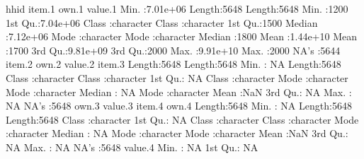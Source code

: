 \begin{Schunk}
\begin{Soutput}
      hhid             item.1             own.1              value.1    
 Min.   :7.01e+06   Length:5648        Length:5648        Min.   :1200  
 1st Qu.:7.04e+06   Class :character   Class :character   1st Qu.:1500  
 Median :7.12e+06   Mode  :character   Mode  :character   Median :1800  
 Mean   :1.44e+10                                         Mean   :1700  
 3rd Qu.:9.81e+09                                         3rd Qu.:2000  
 Max.   :9.91e+10                                         Max.   :2000  
                                                          NA's   :5644  
    item.2             own.2              value.2        item.3         
 Length:5648        Length:5648        Min.   : NA    Length:5648       
 Class :character   Class :character   1st Qu.: NA    Class :character  
 Mode  :character   Mode  :character   Median : NA    Mode  :character  
                                       Mean   :NaN                      
                                       3rd Qu.: NA                      
                                       Max.   : NA                      
                                       NA's   :5648                     
    own.3              value.3        item.4             own.4          
 Length:5648        Min.   : NA    Length:5648        Length:5648       
 Class :character   1st Qu.: NA    Class :character   Class :character  
 Mode  :character   Median : NA    Mode  :character   Mode  :character  
                    Mean   :NaN                                         
                    3rd Qu.: NA                                         
                    Max.   : NA                                         
                    NA's   :5648                                        
    value.4    
 Min.   : NA   
 1st Qu.: NA   

\end{Soutput}
\end{Schunk}
